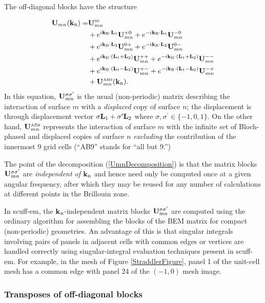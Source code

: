 The off-diagonal blocks have the structure

\begin{align}
\mathbf{U}_{mn}(\mathbf{k}_{\hbox{\tiny{B}}})
 =   &\mathbf{U}_{mn}^{\hbox{\tiny{00}}}
\label{UmnDecomposition}\\
   & + e^{ i \mathbf{k}_{\hbox{\tiny{B}}} \cdot \mathbf{L}_1} \mathbf{U}_{mn}^{+0}
     + e^{-i \mathbf{k}_{\hbox{\tiny{B}}} \cdot \mathbf{L}_1} \mathbf{U}_{mn}^{-0}
\nonumber \\
   & + e^{ i \mathbf{k}_{\hbox{\tiny{B}}} \cdot \mathbf{L}_2} \mathbf{U}_{mn}^{0+}
     + e^{-i \mathbf{k}_{\hbox{\tiny{B}}} \cdot \mathbf{L}_2} \mathbf{U}_{mn}^{0-}
\nonumber \\
   & + e^{ i \mathbf{k}_{\hbox{\tiny{B}}} \cdot (\mathbf{L}_1+\mathbf{L}_2)} \mathbf{U}_{mn}^{++}
     + e^{-i \mathbf{k}_{\hbox{\tiny{B}}} \cdot (\mathbf{L}_1+\mathbf{L}_2)} \mathbf{U}_{mn}^{--}
\nonumber \\
   & + e^{ i \mathbf{k}_{\hbox{\tiny{B}}} \cdot (\mathbf{L}_1-\mathbf{L}_2)} \mathbf{U}_{mn}^{+-}
     + e^{-i \mathbf{k}_{\hbox{\tiny{B}}} \cdot (\mathbf{L}_1-\mathbf{L}_2)} \mathbf{U}_{mn}^{-+}
\nonumber \\
   & + \mathbf{U}_{mn}^{\hbox{\tiny{AB9}}}(\mathbf{k}_{\hbox{\tiny{B}}}).
\nonumber
\end{align}
In this equation, $\mathbf{U}_{mn}^{\sigma \sigma^\prime}$ is the usual 
(non-periodic) matrix describing the interaction of surface $m$ 
with a \textit{displaced} copy of surface $n$; the displacement 
is through displacement vector $\sigma \mathbf{L}_1 + \sigma^\prime \mathbf{L}_2$
where $\sigma,\sigma^\prime \in \{-1,0,1\}.$ 
On the other hand, $\mathbf{U}_{mn}^{\hbox{\tiny{AB9}}}$ represents the interaction
of surface $m$ with the infinite set of Bloch-phased 
and displaced copies of surface $n$ \textit{excluding} the contribution
of the innermost 9 grid cells (``AB9'' stands for ``all but 9.'')

The point of the decomposition (\ref{UmnDecomposition}) is that 
the matrix blocks $\mathbf{U}_{mn}^{\sigma\sigma^\prime}$ are 
\textit{independent of $\mathbf{k}_{\hbox{\tiny{B}}}$} and hence need only be computed 
once at a given angular frequency, after which they may be reused
for any number of calculations at different points in the Brillouin
zone. 

In {\sc scuff-em}, the $\mathbf{k}_{\hbox{\tiny{B}}}$-independent matrix blocks 
$\mathbf{U}_{mn}^{\sigma\sigma^\prime}$ are computed using the ordinary
algorithm for assembling the blocks of the BEM matrix 
for compact (non-periodic) geometries. An advantage of this
is that singular integrals involving pairs of panels in
adjacent cells with common edges or vertices are handled
correctly using singular-integral evaluation techniques
present in {\sc scuff-em}.
For example, in the mesh of Figure \ref{StraddlerFigure},
panel 1 of the unit-cell mesh has a common edge 
with panel 24 of the $(-1,0)$ mesh image.

\subsubsection*{Transposes of off-diagonal blocks}


